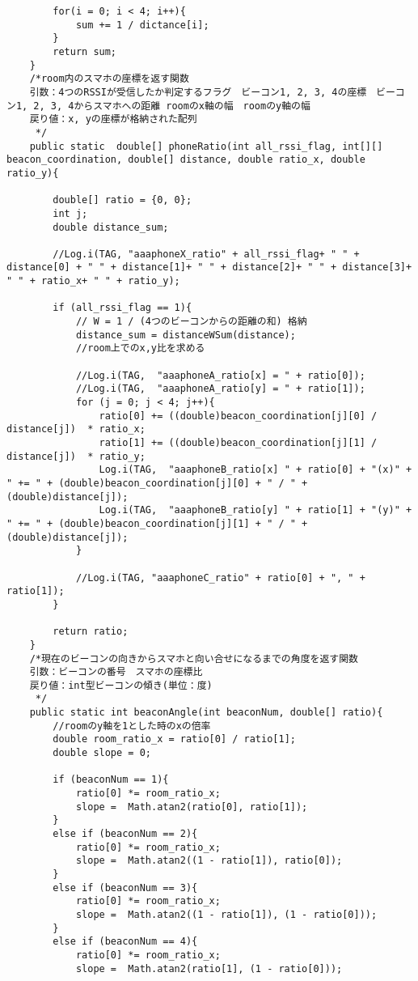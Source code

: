 \documentclass[11pt,a4j]{jarticle}
\begin{document}
\begin{verbatim}
        for(i = 0; i < 4; i++){
            sum += 1 / dictance[i];
        }
        return sum;
    }
    /*room内のスマホの座標を返す関数　
    引数：4つのRSSIが受信したか判定するフラグ　ビーコン1, 2, 3, 4の座標　ビーコン1, 2, 3, 4からスマホへの距離 roomのx軸の幅　roomのy軸の幅
    戻り値：x, yの座標が格納された配列
     */
    public static  double[] phoneRatio(int all_rssi_flag, int[][] beacon_coordination, double[] distance, double ratio_x, double ratio_y){

        double[] ratio = {0, 0};
        int j;
        double distance_sum;

        //Log.i(TAG, "aaaphoneX_ratio" + all_rssi_flag+ " " + distance[0] + " " + distance[1]+ " " + distance[2]+ " " + distance[3]+ " " + ratio_x+ " " + ratio_y);

        if (all_rssi_flag == 1){
            // W = 1 / (4つのビーコンからの距離の和) 格納
            distance_sum = distanceWSum(distance);
            //room上でのx,y比を求める

            //Log.i(TAG,  "aaaphoneA_ratio[x] = " + ratio[0]);
            //Log.i(TAG,  "aaaphoneA_ratio[y] = " + ratio[1]);
            for (j = 0; j < 4; j++){
                ratio[0] += ((double)beacon_coordination[j][0] / distance[j])  * ratio_x;
                ratio[1] += ((double)beacon_coordination[j][1] / distance[j])  * ratio_y;
                Log.i(TAG,  "aaaphoneB_ratio[x] " + ratio[0] + "(x)" + " += " + (double)beacon_coordination[j][0] + " / " + (double)distance[j]);
                Log.i(TAG,  "aaaphoneB_ratio[y] " + ratio[1] + "(y)" + " += " + (double)beacon_coordination[j][1] + " / " + (double)distance[j]);
            }

            //Log.i(TAG, "aaaphoneC_ratio" + ratio[0] + ", " + ratio[1]);
        }

        return ratio;
    }
    /*現在のビーコンの向きからスマホと向い合せになるまでの角度を返す関数
    引数：ビーコンの番号　スマホの座標比
    戻り値：int型ビーコンの傾き(単位：度)
     */
    public static int beaconAngle(int beaconNum, double[] ratio){
        //roomのy軸を1とした時のxの倍率
        double room_ratio_x = ratio[0] / ratio[1];
        double slope = 0;

        if (beaconNum == 1){
            ratio[0] *= room_ratio_x;
            slope =  Math.atan2(ratio[0], ratio[1]);
        }
        else if (beaconNum == 2){
            ratio[0] *= room_ratio_x;
            slope =  Math.atan2((1 - ratio[1]), ratio[0]);
        }
        else if (beaconNum == 3){
            ratio[0] *= room_ratio_x;
            slope =  Math.atan2((1 - ratio[1]), (1 - ratio[0]));
        }
        else if (beaconNum == 4){
            ratio[0] *= room_ratio_x;
            slope =  Math.atan2(ratio[1], (1 - ratio[0]));


\end{verbatim}
\end{document}

